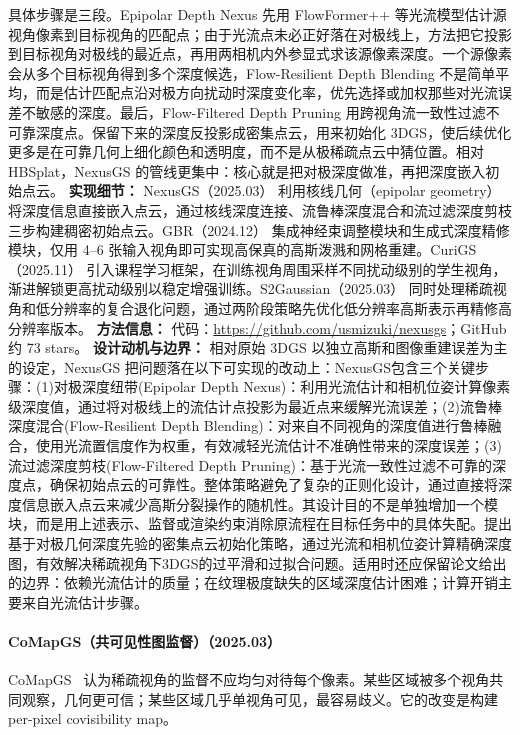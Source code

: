 具体步骤是三段。Epipolar Depth Nexus 先用 FlowFormer++ 等光流模型估计源视角像素到目标视角的匹配点；由于光流点未必正好落在对极线上，方法把它投影到目标视角对极线的最近点，再用两相机内外参显式求该源像素深度。一个源像素会从多个目标视角得到多个深度候选，Flow-Resilient Depth Blending 不是简单平均，而是估计匹配点沿对极方向扰动时深度变化率，优先选择或加权那些对光流误差不敏感的深度。最后，Flow-Filtered Depth Pruning 用跨视角流一致性过滤不可靠深度点。保留下来的深度反投影成密集点云，用来初始化 3DGS，使后续优化更多是在可靠几何上细化颜色和透明度，而不是从极稀疏点云中猜位置。相对 HBSplat，NexusGS 的管线更集中：核心就是把对极深度做准，再把深度嵌入初始点云。
\textbf{实现细节：} NexusGS（2025.03） 利用核线几何（epipolar geometry）将深度信息直接嵌入点云，通过核线深度连接、流鲁棒深度混合和流过滤深度剪枝三步构建稠密初始点云。GBR（2024.12） 集成神经束调整模块和生成式深度精修模块，仅用 4--6 张输入视角即可实现高保真的高斯泼溅和网格重建。CuriGS（2025.11） 引入课程学习框架，在训练视角周围采样不同扰动级别的学生视角，渐进解锁更高扰动级别以稳定增强训练。S2Gaussian（2025.03） 同时处理稀疏视角和低分辨率的复合退化问题，通过两阶段策略先优化低分辨率高斯表示再精修高分辨率版本。
\textbf{方法信息：} 代码：\url{https://github.com/usmizuki/nexusgs}；GitHub 约 73 stars。
\textbf{设计动机与边界：} 相对原始 3DGS 以独立高斯和图像重建误差为主的设定，NexusGS 把问题落在以下可实现的改动上：NexusGS包含三个关键步骤：(1)对极深度纽带(Epipolar Depth Nexus)：利用光流估计和相机位姿计算像素级深度值，通过将对极线上的流估计点投影为最近点来缓解光流误差；(2)流鲁棒深度混合(Flow-Resilient Depth Blending)：对来自不同视角的深度值进行鲁棒融合，使用光流置信度作为权重，有效减轻光流估计不准确性带来的深度误差；(3)流过滤深度剪枝(Flow-Filtered Depth Pruning)：基于光流一致性过滤不可靠的深度点，确保初始点云的可靠性。整体策略避免了复杂的正则化设计，通过直接将深度信息嵌入点云来减少高斯分裂操作的随机性。其设计目的不是单独增加一个模块，而是用上述表示、监督或渲染约束消除原流程在目标任务中的具体失配。提出基于对极几何深度先验的密集点云初始化策略，通过光流和相机位姿计算精确深度图，有效解决稀疏视角下3DGS的过平滑和过拟合问题。适用时还应保留论文给出的边界：依赖光流估计的质量；在纹理极度缺失的区域深度估计困难；计算开销主要来自光流估计步骤。
\paragraph{CoMapGS（共可见性图监督）（2025.03）}
CoMapGS~\cite{2503_20998} 认为稀疏视角的监督不应均匀对待每个像素。某些区域被多个视角共同观察，几何更可信；某些区域几乎单视角可见，最容易歧义。它的改变是构建 per-pixel covisibility map。


